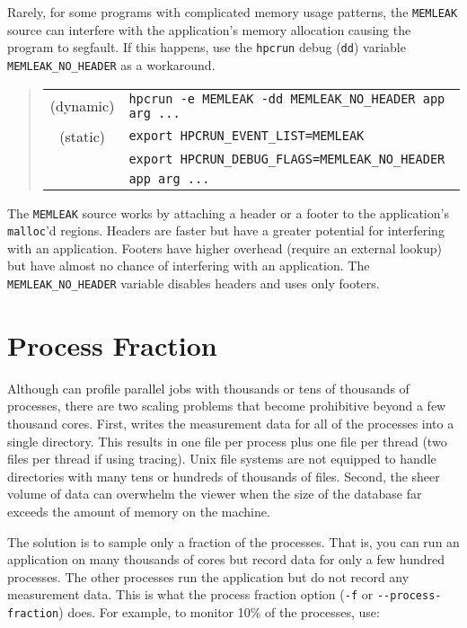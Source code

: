 Rarely, for some programs with complicated memory usage patterns, the
\verb|MEMLEAK| source can interfere with the application's memory
allocation causing the program to segfault.  If this happens, use the
\verb|hpcrun| debug ({\tt dd}) variable \verb|MEMLEAK_NO_HEADER| as a
workaround.

\begin{quote}
\begin{tabular}{@{}cl}
(dynamic) & \verb|hpcrun -e MEMLEAK -dd MEMLEAK_NO_HEADER app arg ...| \\
(static)  & \verb|export HPCRUN_EVENT_LIST=MEMLEAK| \\
& \verb|export HPCRUN_DEBUG_FLAGS=MEMLEAK_NO_HEADER| \\
& \verb|app arg ...|
\end{tabular}
\end{quote}

The \verb|MEMLEAK| source works by attaching a header or a footer to
the application's \verb|malloc|'d regions.  Headers are faster but
have a greater potential for interfering with an application.  Footers
have higher overhead (require an external lookup) but have almost no
chance of interfering with an application.  The
\verb|MEMLEAK_NO_HEADER| variable disables headers and uses only
footers.


\section{Process Fraction}

Although \hpcrun{} can profile parallel jobs with thousands or tens of
thousands of processes, there are two scaling problems that become
prohibitive beyond a few thousand cores.  First, \hpcrun{} writes the
measurement data for all of the processes into a single directory.
This results in one file per process plus one file per thread (two
files per thread if using tracing).  Unix file systems are not
equipped to handle directories with many tens or hundreds of thousands
of files.  Second, the sheer volume of data can overwhelm the viewer
when the size of the database far exceeds the amount of memory on the
machine.

The solution is to sample only a fraction of the processes.  That is,
you can run an application on many thousands of cores but record data
for only a few hundred processes.  The other processes run the
application but do not record any measurement data.  This is what the
process fraction option (\verb|-f| or \verb|--process-fraction|) does.
For example, to monitor 10\% of the processes, use:

